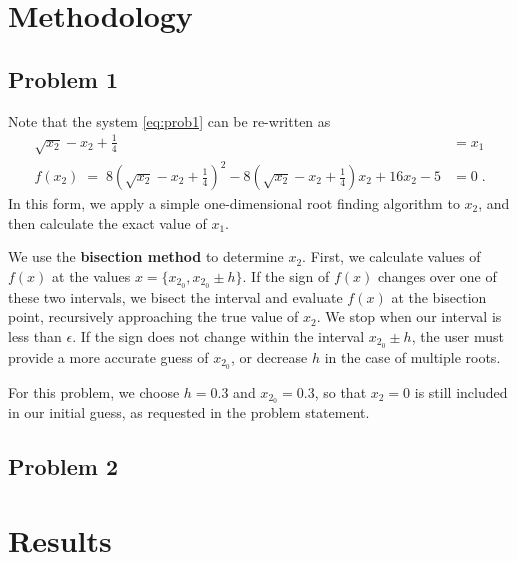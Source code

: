 \documentclass[12pt]{article}
\begin{document}
\section{Methodology} %

\subsection{Problem 1}

Note that the system \eqref{eq:prob1} can be re-written as
\begin{equation}
\begin{alignedat}{2}
\sqrt{x_2} - x_2 + \tfrac{1}{4} &= x_1 \\
f(x_2) \; = \; 8 \left( \sqrt{x_2} - x_2 + \tfrac{1}{4} \right)^2 - 8 \left( \sqrt{x_2} - x_2 + \tfrac{1}{4} \right) x_2 + 16 x_2 - 5  &= 0
\;.
\end{alignedat}
\label{eq:prob1rewrite}
\end{equation}
In this form, we apply a simple one-dimensional root finding algorithm to $x_2$, and then calculate the exact value of $x_1$.

We use the \textbf{bisection method} to determine $x_2$. First, we calculate values of $f(x)$ at the values $x = \{ x_{2_0}, x_{2_0} \pm h \}$. If the sign of $f(x)$ changes over one of these two intervals, we bisect the interval and evaluate $f(x)$ at the bisection point, recursively approaching the true value of $x_2$. We stop when our interval is less than $\epsilon$. If the sign does not change within the interval $x_{2_0} \pm h$, the user must provide a more accurate guess of $x_{2_0}$, or decrease $h$ in the case of multiple roots.

For this problem, we choose $h=0.3$ and $x_{2_0} = 0.3$, so that $x_2=0$ is still included in our initial guess, as requested in the problem statement.

\subsection{Problem 2}

\section{Results} %
\end{document}
